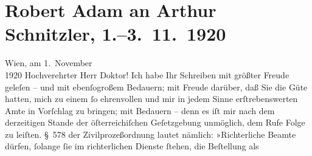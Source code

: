 

         
         \renewcommand{\erwaehntePersonen}{Personen: Robert Adam}
         \renewcommand{\erwaehnteInstitutionen}{Institutionen: Deutschösterreichischer Autorenverband, Vereinigung der österreichischen Richterinnen und Richter}
         \renewcommand{\erwaehnteOrte}{Orte: Wien}
         \renewcommand{\erwaehnteWerke}{}
               \section[Robert Adam an Arthur Schnitzler, 1.–3. 11. 1920]{ Robert Adam an Arthur Schnitzler, 1.–3. 11. 1920}\nopagebreak{}\rehead{ }\begin{ledgroupsized}[t]{13cm}\normalsize\beginnumbering \toendnotes[C]{\smallbreak\pagebreak[2]} 
\toendnotes[C]{\smallbreak}\pstart
           \raggedleft{}{\pb}Wien, am 1. November{\\}1920\pend
           \pstart\center{}Hochverehrter Herr Doktor!\pend\pstart
           Ich habe Ihr Schreiben mit größter Freude geleſen – und mit ebenſogroßem Bedauern;
               mit Freude darüber, daß Sie die Güte hatten, mich zu einem ſo ehrenvollen und mir in
               jedem Sinne erſtrebenswerten Amte in Vorſchlag zu bringen; mit Bedauern – denn es iſt
               mir nach dem derzeitigen Stande der öſterreichiſchen Geſetzgebung unmöglich, dem Rufe
               Folge zu leiſten. § 578 der Zivilprozeßordnung lautet nämlich: »Richterliche Beamte
               dürfen, ſolange ſie im richterlichen Dienste ſtehen, die Beſtellung als

\end{ledgroupsized}

